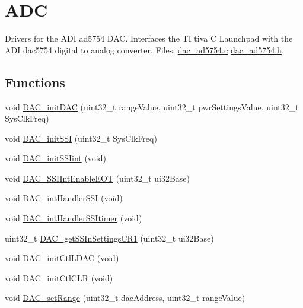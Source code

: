\hypertarget{group___d_a_c__ad5754}{\section{A\+D\+C}
\label{group___d_a_c__ad5754}
}


Drivers for the A\+D\+I ad5754 D\+A\+C. Interfaces the T\+I tiva C Launchpad with the A\+D\+I dac5754 digital to analog converter. Files\+: \hyperlink{dac__ad5754_8c_source}{dac\+\_\+ad5754.\+c} \hyperlink{dac__ad5754_8h_source}{dac\+\_\+ad5754.\+h}.  


\subsection*{Functions}
\begin{DoxyCompactItemize}
\item 
void \hyperlink{group___d_a_c__ad5754_ga65670bedae308f00f19b4a95e444d0c6}{D\+A\+C\+\_\+init\+D\+A\+C} (uint32\+\_\+t range\+Value, uint32\+\_\+t pwr\+Settings\+Value, uint32\+\_\+t Sys\+Clk\+Freq)
\item 
void \hyperlink{group___d_a_c__ad5754_ga5c32da52b4ee8acf91ae4309ff8056aa}{D\+A\+C\+\_\+init\+S\+S\+I} (uint32\+\_\+t Sys\+Clk\+Freq)
\item 
void \hyperlink{group___d_a_c__ad5754_ga63a8682c2a50d7edc7a8cca6a84b0292}{D\+A\+C\+\_\+init\+S\+S\+Iint} (void)
\item 
void \hyperlink{group___d_a_c__ad5754_ga95cf8880ebefcfa5a3c877f33a0de56f}{D\+A\+C\+\_\+\+S\+S\+I\+Int\+Enable\+E\+O\+T} (uint32\+\_\+t ui32\+Base)
\item 
void \hyperlink{group___d_a_c__ad5754_gaabc6352feab3ad0f94de4b79bc0f5b72}{D\+A\+C\+\_\+int\+Handler\+S\+S\+I} (void)
\item 
void \hyperlink{group___d_a_c__ad5754_ga37030529d834f166eef7114fd71190e5}{D\+A\+C\+\_\+int\+Handler\+S\+S\+Itimer} (void)
\item 
uint32\+\_\+t \hyperlink{group___d_a_c__ad5754_gaa7ca584d832a5a8155f2715e0c583f95}{D\+A\+C\+\_\+get\+S\+S\+In\+Settings\+C\+R1} (uint32\+\_\+t ui32\+Base)
\item 
void \hyperlink{group___d_a_c__ad5754_gaa41f00f804f48c88f4aee18a02aa6a8e}{D\+A\+C\+\_\+init\+Ctl\+L\+D\+A\+C} (void)
\item 
void \hyperlink{group___d_a_c__ad5754_ga33b8dcd9e7b399418db9f3f2f6d6cad7}{D\+A\+C\+\_\+init\+Ctl\+C\+L\+R} (void)
\item 
void \hyperlink{group___d_a_c__ad5754_ga04548e3a1e5b6a200c540b7a4227ec4d}{D\+A\+C\+\_\+set\+Range} (uint32\+\_\+t dac\+Address, uint32\+\_\+t range\+Value)

\end{DoxyCompactItemize}
